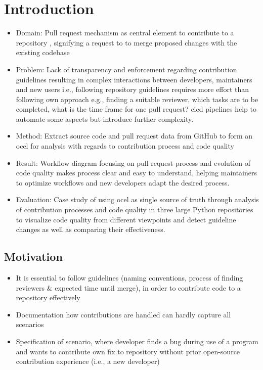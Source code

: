\chapter{Introduction}
\label{chap:intro}

\begin{itemize}
	\item Domain: Pull request mechanism as central element to contribute to a repository \autocite{DBLP:conf/icse/TsayDH14}, signifying a request to to merge proposed changes with the existing codebase
	\item Problem: Lack of transparency and enforcement regarding contribution guidelines resulting in complex interactions between developers, maintainers and new users i.e., following repository guidelines requires more effort than following own approach e.g., finding a suitable reviewer, which tasks are to be completed, what is the time frame for one pull request? \ac{cicd} pipelines help to automate some aspects but introduce further complexity.
	\item Method: Extract source code and pull request data from GitHub to form an \ac{ocel} for analysis with regards to contribution process and code quality
	\item Result: Workflow diagram focusing on pull request process and evolution of code quality makes process clear and easy to understand, helping maintainers to optimize workflows and new developers adapt the desired process. 
	\item Evaluation: Case study of using \ac{ocel} as single source of truth through analysis of contribution processes and code quality in three large Python repositories to visualize code quality from different viewpoints and detect guideline changes as well as comparing their effectiveness.
\end{itemize}

\section{Motivation}
\label{sec:intro_ssec:motiv}
\begin{itemize}
	\item It is essential to follow guidelines (naming conventions, process of finding reviewers \& expected time until merge), in order to contribute code to a repository effectively
	\item Documentation how contributions are handled can hardly capture all scenarios
	\item Specification of scenario, where developer finds a bug during use of a program and wants to contribute own fix to repository without prior open-source contribution experience (i.e., a new developer)
\end{itemize}

